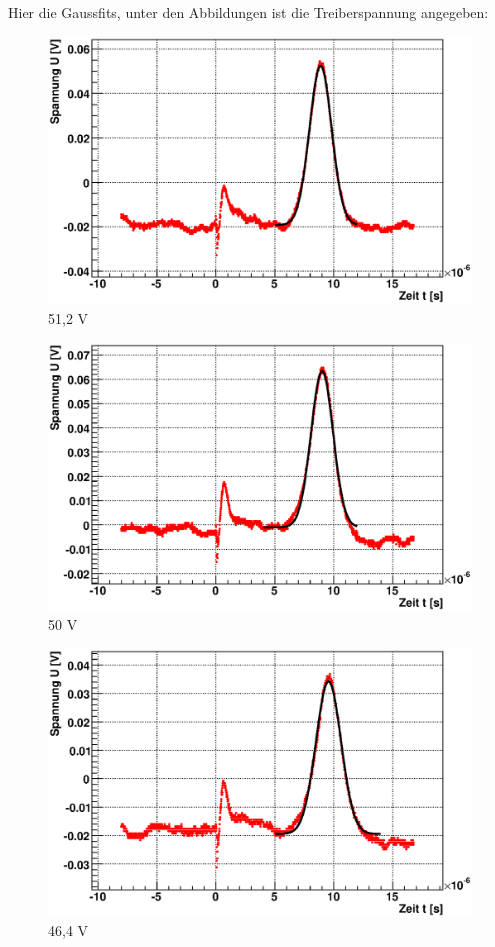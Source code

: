 \documentclass[12pt]{article}
\begin{document}
Hier die Gaussfits, unter den Abbildungen ist die Treiberspannung angegeben:

\begin{figure}[H]  
\begin{minipage}{0.33\linewidth}
\centering
\includegraphics[width=0.9\linewidth]{pictures/varVolt/00.eps}
\small{51,2 V}
\end{minipage}
\begin{minipage}{0.33\linewidth}
\centering
\includegraphics[width=0.9\linewidth]{pictures/varVolt/01.eps}
\small{50 V}
\end{minipage}
\begin{minipage}{0.33\linewidth}
\centering 
\includegraphics[width=0.9\linewidth]{pictures/varVolt/02.eps}
\small{46,4 V}
\end{minipage}
\end{figure}
\end{document}
